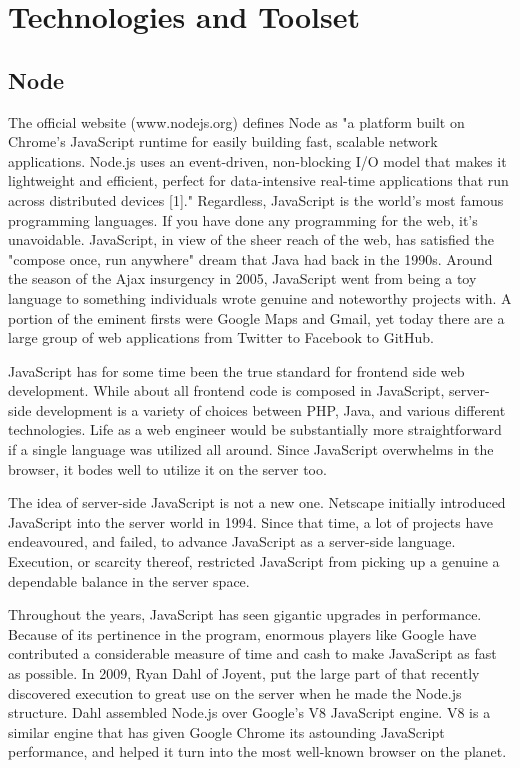 \documentclass[../thesis.tex]{subfiles}
\begin{document}
\section{Technologies and Toolset}

\subsection{Node}
The official website (www.nodejs.org) defines Node as "a platform built on Chrome's JavaScript runtime for easily building fast, scalable network applications. Node.js uses an event-driven, non-blocking I/O model that makes it lightweight and efficient, perfect for data-intensive real-time applications that run across distributed devices [1]."
\vspace{5mm}
Regardless, JavaScript is the world's most famous programming languages. If you have done any programming for the web, it's unavoidable. JavaScript, in view of the sheer reach of the web, has satisfied the "compose once, run anywhere" dream that Java had back in the 1990s.  
Around the season of the Ajax insurgency in 2005, JavaScript went from being a toy language to something individuals wrote genuine and noteworthy projects with. A portion of the eminent firsts were Google Maps and Gmail, yet today there are a large group of web applications from Twitter to Facebook to GitHub.
\vspace{5mm}

JavaScript has for some time been the true standard for frontend side web development. While about all frontend code is composed in JavaScript, server-side development is a variety of choices between PHP, Java, and various different technologies. Life as a web engineer would be substantially more straightforward if a single language was utilized all around. Since JavaScript overwhelms in the browser, it bodes well to utilize it on the server too. 
\vspace{5mm}

The idea of server-side JavaScript is not a new one. Netscape initially introduced JavaScript into the server world in 1994. Since that time, a lot of projects have endeavoured, and failed, to advance JavaScript as a server-side language. Execution, or scarcity thereof, restricted JavaScript from picking up a genuine a dependable balance in the server space. 
\vspace{5mm}

Throughout the years, JavaScript has seen gigantic upgrades in performance. Because of its pertinence in the program, enormous players like Google have contributed a considerable measure of time and cash to make JavaScript as fast as possible. In 2009, Ryan Dahl of Joyent, put the large part of that recently discovered execution to great use on the server when he made the Node.js structure. Dahl assembled Node.js over Google's V8 JavaScript engine. V8 is a similar engine that has given Google Chrome its astounding JavaScript performance, and helped it turn into the most well-known browser on the planet.
\newpage
\end{document}
